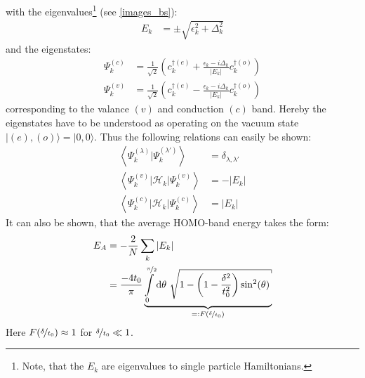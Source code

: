 with the eigenvalues\footnote{Note, that the $E_k$ are eigenvalues to single particle Hamiltonians.} (see \cref{images_bs}):
\begin{align}
	E_k &= \pm \sqrt{\epsilon_k^2+\Delta_k^2}
	\label{equation_energy_band}
\end{align}
and the eigenstates:
\begin{align}
	\Psi_k^{(c)} &= \frac{1}{\sqrt{2}}\left(c_k^{\dagger(e)}+\frac{\epsilon_k - i \Delta_k}{|E_k|}c_{k}^{\dagger(o)}\right)
	\label{equation_conduction_eigenstate}\\
	\Psi_k^{(v)} &= \frac{1}{\sqrt{2}}\left(c_k^{\dagger(e)}-\frac{\epsilon_k - i \Delta_k}{|E_k|}c_{k}^{\dagger(o)}\right)
	\label{equation_valence_eigenstate}
\end{align}
corresponding to the valance $(v)$ and conduction $(c)$ band. Hereby the eigenstates have to be understood as operating on the vacuum state $|(e),(o)\rangle = |0,0\rangle$. Thus the following relations can easily be shown:
\begin{align}
	\left\langle\Psi_k^{(\lambda)}\Big|\Psi_k^{(\lambda\prime)}\right\rangle &= \delta_{\lambda,\lambda\prime}\\
	\left\langle\Psi_k^{(v)}\Big|\mathcal{H}_{k}\Big|\Psi_k^{(v)}\right\rangle &= - |E_k|\\
	\left\langle\Psi_k^{(c)}\Big|\mathcal{H}_{k}\Big|\Psi_k^{(c)}\right\rangle &= |E_k|
\end{align}
It can also be shown, that the average HOMO-band energy takes the form:
\begin{align}
E_A &=-\frac{2}{N}\sum_k |E_k|\\
&=\frac{-4t_0}{\pi}\underbrace{\int\limits_{0}^{\nicefrac{\pi}{2}}\text{d}\theta\ \sqrt{1-\left(1-\frac{\delta^2}{t_0^2}\right)\sin^2(\theta)}}_{=:F(\nicefrac{\delta}{t_0})}
\end{align}
Here $F\left(\nicefrac{\delta}{t_0}\right)\approx 1$ for $\nicefrac{\delta}{t_0} \ll 1$.